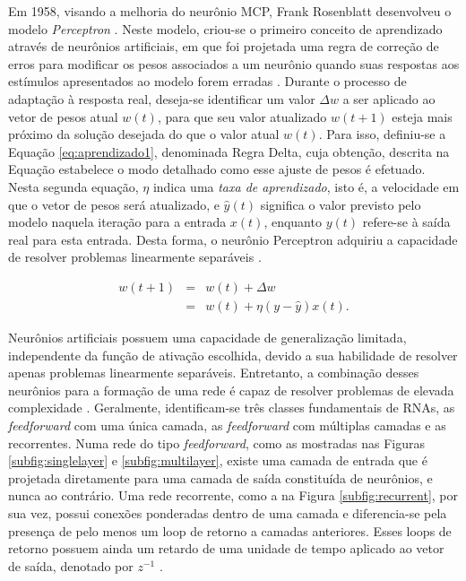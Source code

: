 Em 1958, visando a melhoria do neurônio MCP, Frank Rosenblatt desenvolveu o modelo \emph{Perceptron} \cite{Rosenblatt}. Neste modelo, criou-se o primeiro conceito de aprendizado através de neurônios artificiais, em que foi projetada uma regra de correção de erros para modificar os pesos associados a um neurônio quando suas respostas aos estímulos apresentados ao modelo forem erradas \cite{arbib}. Durante o processo de adaptação à resposta real, deseja-se identificar um valor $\Delta w$ a ser aplicado ao vetor de pesos atual $w(t)$, para que seu valor atualizado $w(t+1)$ esteja mais próximo da solução desejada do que o valor atual $w(t)$. Para isso, definiu-se a Equação \ref{eq:aprendizado1}, denominada Regra Delta, cuja obtenção, descrita na Equação \label{eq:aprendizado2} estabelece o modo detalhado como esse ajuste de pesos é efetuado. Nesta segunda equação, $\eta$ indica uma \emph{taxa de aprendizado}, isto é, a velocidade em que o vetor de pesos será atualizado, e $\hat{y}(t)$ significa o valor previsto pelo modelo naquela iteração para a entrada $x(t)$, enquanto $y(t)$ refere-se à saída real para esta entrada. Desta forma, o neurônio Perceptron adquiriu a capacidade de resolver problemas linearmente separáveis \cite{braga}.

\begin{eqnarray}
  w(t+1) &=& w(t) + \Delta w   \label{eq:aprendizado1}\\
  &=& w(t) + \eta (y - \hat{y}) x(t) \label{eq:aprendizado2}.
\end{eqnarray}

Neurônios artificiais possuem uma capacidade de generalização limitada, independente da função de ativação escolhida, devido a sua habilidade de resolver apenas problemas linearmente separáveis. Entretanto, a combinação desses neurônios para a formação de uma rede é capaz de resolver problemas de elevada complexidade \cite{braga}. Geralmente, identificam-se três classes fundamentais de RNAs, as \emph{feedforward} com uma única camada, as \emph{feedforward} com múltiplas camadas e as recorrentes. Numa rede do tipo \emph{feedforward}, como as mostradas nas Figuras \ref{subfig:singlelayer} e \ref{subfig:multilayer}, existe uma camada de entrada que é projetada diretamente para uma camada de saída constituída de neurônios, e nunca ao contrário. Uma rede recorrente, como a na Figura \ref{subfig:recurrent}, por sua vez, possui conexões ponderadas dentro de uma camada e diferencia-se pela presença de pelo menos um loop de retorno a camadas anteriores. Esses loops de retorno possuem ainda um retardo de uma unidade de tempo aplicado ao vetor de saída, denotado por $z^{-1}$ \cite{haykin}.

